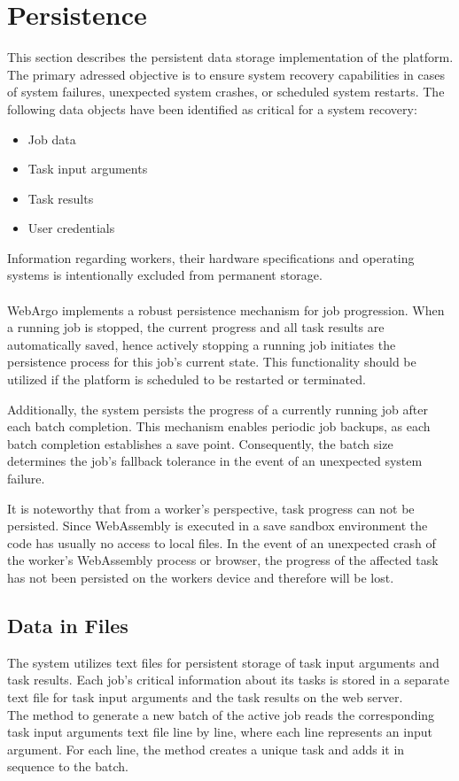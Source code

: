 \section{Persistence}
\label{sec:implementation:persistence}
This section describes the persistent data storage implementation of the platform. The primary adressed objective is to ensure system recovery capabilities in cases of system failures, unexpected system crashes, or scheduled system restarts. The following data objects have been identified as critical for a system recovery:
\begin{itemize}
    \item Job data
    \item Task input arguments
    \item Task results
    \item User credentials
\end{itemize}
Information regarding workers, their hardware specifications and operating systems is intentionally excluded from permanent storage.
\\~\\
WebArgo implements a robust persistence mechanism for job progression. When a running job is stopped, the current progress and all task results are automatically saved, hence actively stopping a running job initiates the persistence process for this job's current state. This functionality should be utilized if the platform is scheduled to be restarted or terminated.

Additionally, the system persists the progress of a currently running job after each batch completion. This mechanism enables periodic job backups, as each batch completion establishes a save point. Consequently, the batch size determines the job's fallback tolerance in the event of an unexpected system failure.

It is noteworthy that from a worker's perspective, task progress can not be persisted. Since WebAssembly is executed in a save sandbox environment the code has usually no access to local files. In the event of an unexpected crash of the worker's WebAssembly process or browser, the progress of the affected task has not been persisted on the workers device and therefore will be lost.

\subsection{Data in Files}
The system utilizes text files for persistent storage of task input arguments and task results. Each job's critical information about its tasks is stored in a separate text file for task input arguments and the task results on the web server. 
~\\
The method to generate a new batch of the active job reads the corresponding task input arguments text file line by line, where each line represents an input argument. For each line, the method creates a unique task and adds it in sequence to the batch.

